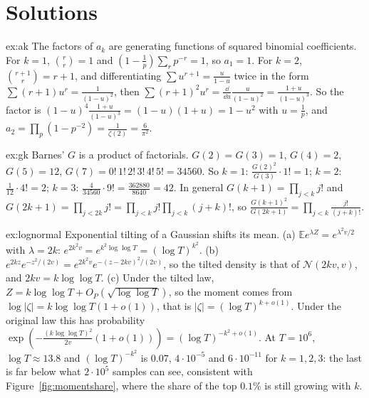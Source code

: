 \section{Solutions}

\begin{solution}{ex:ak}
\idea The factors of $a_k$ are generating functions of squared binomial coefficients.
\writeup For $k=1$, $\binom r r=1$ and $(1-\frac1p)\sum_rp^{-r}=1$, so $a_1=1$. For $k=2$, $\binom{r+1}r=r+1$, and differentiating $\sum u^{r+1}=\frac u{1-u}$ twice in the form $\sum(r+1)u^r=\frac1{(1-u)^2}$, then $\sum(r+1)^2u^r=\frac{\dd}{\dd u}\frac u{(1-u)^2}=\frac{1+u}{(1-u)^3}$. So the factor is $(1-u)^4\frac{1+u}{(1-u)^3}=(1-u)(1+u)=1-u^2$ with $u=\frac1p$, and $a_2=\prod_p(1-p^{-2})=\frac1{\zeta(2)}=\frac6{\pi^2}$.
\end{solution}

\begin{solution}{ex:gk}
\idea Barnes' $G$ is a product of factorials.
\writeup $G(2)=G(3)=1$, $G(4)=2$, $G(5)=12$, $G(7)=0!\,1!\,2!\,3!\,4!\,5!=34560$. So $k=1$: $\frac{G(2)^2}{G(3)}\cdot1!=1$; $k=2$: $\frac1{12}\cdot4!=2$; $k=3$: $\frac4{34560}\cdot9!=\frac{362880}{8640}=42$. In general $G(k+1)=\prod_{j<k}j!$ and $G(2k+1)=\prod_{j<2k}j!=\prod_{j<k}j!\prod_{j<k}(j+k)!$, so $\frac{G(k+1)^2}{G(2k+1)}=\prod_{j<k}\frac{j!}{(j+k)!}$.
\end{solution}

\begin{solution}{ex:lognormal}
\idea Exponential tilting of a Gaussian shifts its mean.
\writeup (a) $\mathbb Ee^{\lambda Z}=e^{\lambda^2v/2}$ with $\lambda=2k$: $e^{2k^2v}=e^{k^2\log\log T}=(\log T)^{k^2}$. (b) $e^{2kz}e^{-z^2/(2v)}=e^{2k^2v}e^{-(z-2kv)^2/(2v)}$, so the tilted density is that of $\mathcal N(2kv,v)$, and $2kv=k\log\log T$. (c) Under the tilted law, $Z=k\log\log T+O_P(\sqrt{\log\log T})$, so the moment comes from $\log|\zeta|=k\log\log T(1+o(1))$, that is $|\zeta|=(\log T)^{k+o(1)}$. Under the original law this has probability $\exp(-\frac{(k\log\log T)^2}{2v}(1+o(1)))=(\log T)^{-k^2+o(1)}$. At $T=10^6$, $\log T\approx13.8$ and $(\log T)^{-k^2}$ is $0.07$, $4\cdot10^{-5}$ and $6\cdot10^{-11}$ for $k=1,2,3$: the last is far below what $2\cdot10^5$ samples can see, consistent with Figure~\ref{fig:momentshare}, where the share of the top $0.1\%$ is still growing with $k$.
\end{solution}

